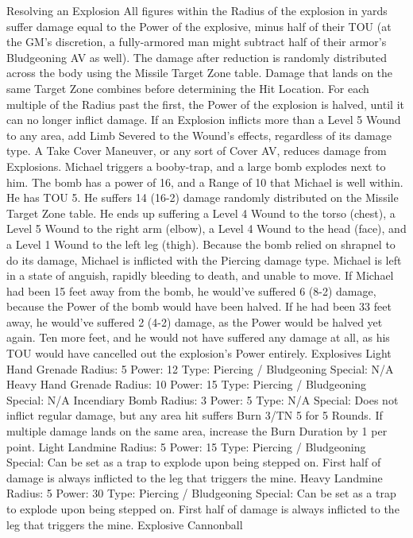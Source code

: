 \documentclass[oneside,11pt,english]{book}
\begin{document}
Resolving an Explosion
All figures within the Radius of the explosion in yards suffer damage equal to the Power of the explosive,
minus half of their TOU (at the GM's discretion, a fully-armored man might subtract half of their armor's
Bludgeoning AV as well). The damage after reduction is randomly distributed across the body using the
Missile Target Zone table. Damage that lands on the same Target Zone combines before determining the
Hit Location.
For each multiple of the Radius past the first, the Power of the explosion is halved, until it can no longer
inflict damage.
If an Explosion inflicts more than a Level 5 Wound to any area, add Limb Severed to the Wound's effects,
regardless of its damage type.
A Take Cover Maneuver, or any sort of Cover AV, reduces damage from Explosions.
Michael triggers a booby-trap, and a large bomb explodes next to him. The bomb has a power of 16, and a Range of 10 that
Michael is well within. He has TOU 5. He suffers 14 (16-2) damage randomly distributed on the Missile Target Zone table. He
ends up suffering a Level 4 Wound to the torso (chest), a Level 5 Wound to the right arm (elbow), a Level 4 Wound to the head
(face), and a Level 1 Wound to the left leg (thigh). Because the bomb relied on shrapnel to do its damage, Michael is inflicted
with the Piercing damage type. Michael is left in a state of anguish, rapidly bleeding to death, and unable to move.
If Michael had been 15 feet away from the bomb, he would've suffered 6 (8-2) damage, because the Power of the bomb would
have been halved. If he had been 33 feet away, he would've suffered 2 (4-2) damage, as the Power would be halved yet again.
Ten more feet, and he would not have suffered any damage at all, as his TOU would have cancelled out the explosion's Power
entirely.
Explosives
Light Hand Grenade
Radius: 5
Power: 12
Type: Piercing / Bludgeoning
Special: N/A
Heavy Hand Grenade
Radius: 10
Power: 15
Type: Piercing / Bludgeoning
Special: N/A
Incendiary Bomb
Radius: 3
Power: 5
Type: N/A
Special: Does not inflict regular damage, but any area hit suffers Burn 3/TN 5 for 5 Rounds. If multiple
damage lands on the same area, increase the Burn Duration by 1 per point.
Light Landmine
Radius: 5
Power: 15
Type: Piercing / Bludgeoning
Special: Can be set as a trap to explode upon being stepped on. First half of damage is always inflicted to
the leg that triggers the mine.
Heavy Landmine
Radius: 5
Power: 30
Type: Piercing / Bludgeoning
Special: Can be set as a trap to explode upon being stepped on. First half of damage is always inflicted to
the leg that triggers the mine.
Explosive Cannonball
\end{document}

